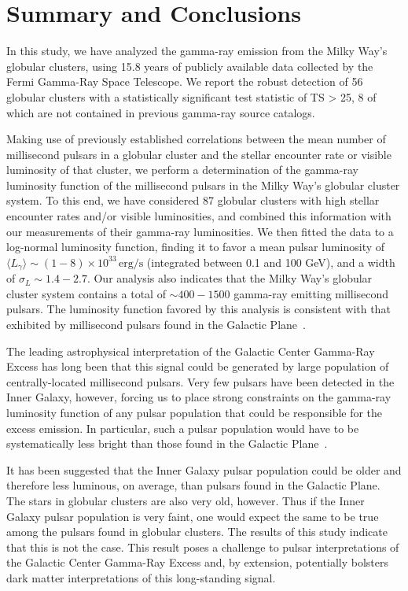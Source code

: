 \section{Summary and Conclusions}

In this study, we have analyzed the gamma-ray emission from the Milky Way's globular clusters, using 15.8 years of publicly available data collected by the Fermi Gamma-Ray Space Telescope. We report the robust detection of 56 globular clusters with a statistically significant test statistic of TS > 25, 8 of which are not contained in previous gamma-ray source catalogs. 

Making use of previously established correlations between the mean number of millisecond pulsars in a globular cluster and the stellar encounter rate or visible luminosity of that cluster, we perform a determination of the gamma-ray luminosity function of the millisecond pulsars in the Milky Way's globular cluster system. To this end, we have considered 87 globular clusters with high stellar encounter rates and/or visible luminosities, and combined this information with our measurements of their gamma-ray luminosities. We then fitted the data to a log-normal luminosity function, finding it to favor a mean pulsar luminosity of $\langle L_{\gamma}\rangle \sim (1-8)\times 10^{33}\, \textrm{erg/s}$ (integrated between 0.1 and 100 GeV), and a width of $\sigma_L \sim 1.4-2.7$. Our analysis also indicates that the Milky Way's globular cluster system contains a total of $\sim 400-1500$ gamma-ray emitting millisecond pulsars. The luminosity function favored by this analysis is consistent with that exhibited by millisecond pulsars found in the Galactic Plane~\cite{Holst:2024fvb}.  

The leading astrophysical interpretation of the Galactic Center Gamma-Ray Excess has long been that this signal could be generated by large population of centrally-located millisecond pulsars. Very few pulsars have been detected in the Inner Galaxy, however, forcing us to place strong constraints on the gamma-ray luminosity function of any pulsar population that could be responsible for the excess emission. In particular, such a pulsar population would have to be systematically less bright than those found in the Galactic Plane~\cite{Holst:2024fvb}. 

It has been suggested that the Inner Galaxy pulsar population could be older and therefore less luminous, on average, than pulsars found in the Galactic Plane. The stars in globular clusters are also very old, however. Thus if the Inner Galaxy pulsar population is very faint, one would expect the same to be true among the pulsars found in globular clusters. The results of this study indicate that this is not the case. This result poses a challenge to pulsar interpretations of the Galactic Center Gamma-Ray Excess and, by extension, potentially bolsters dark matter interpretations of this long-standing signal. 

\bigskip



